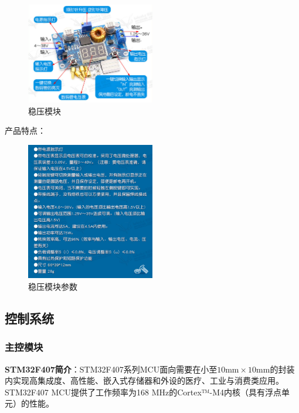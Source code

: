 \documentclass[10pt]{ctexart}
\begin{document}
\begin{figure}[H]
    \centering
    \includegraphics[width = 0.5\textwidth]{stabilivolt/stabilivolt.png}
    \caption{稳压模块}
    \label{fig:stabilivolt}
\end{figure}

产品特点：

\begin{figure}[H]
    \centering
    \includegraphics[width = 0.5\textwidth]{stabilivolt/stabilivolt_parameter.png}
    \caption{稳压模块参数}
    \label{fig:stabilivolt_parameter}
\end{figure}


\subsection{控制系统}
\subsubsection{主控模块}
\textbf{STM32F407简介}：STM32F407系列MCU面向需要在小至$10\si{\milli\meter}\times 10 \si{\milli\meter}$的封装内实现高集成度、高性能、嵌入式存储器和外设的医疗、工业与消费类应用。STM32F407 MCU提供了工作频率为168 MHz的Cortex™-M4内核（具有浮点单元）的性能。
\end{document}
